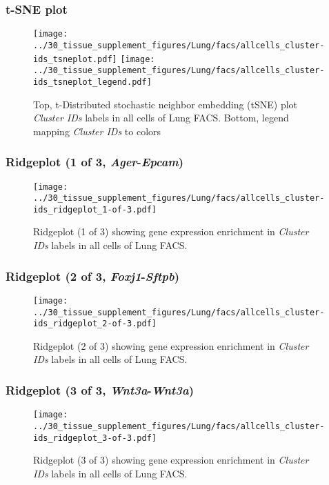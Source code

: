 \clearpage
\subsubsection{t-SNE plot}
\begin{figure}[h]
\centering
\texttt{[image: ../30\_tissue\_supplement\_figures/Lung/facs/allcells\_cluster-ids\_tsneplot.pdf]}
\texttt{[image: ../30\_tissue\_supplement\_figures/Lung/facs/allcells\_cluster-ids\_tsneplot\_legend.pdf]}
\caption{Top, t-Distributed stochastic neighbor embedding (tSNE) plot  \emph{Cluster IDs} labels in all cells of Lung FACS. Bottom, legend mapping \emph{Cluster IDs} to colors}
\end{figure}


\clearpage

\subsubsection{Ridgeplot (1 of 3, \emph{Ager}-\emph{Epcam})}
\begin{figure}[h]
\centering
\texttt{[image: ../30\_tissue\_supplement\_figures/Lung/facs/allcells\_cluster-ids\_ridgeplot\_1-of-3.pdf]}

\caption{ Ridgeplot (1 of 3)  showing gene expression enrichment in \emph{Cluster IDs} labels in all cells of Lung FACS. }
\end{figure}


\clearpage

\subsubsection{Ridgeplot (2 of 3, \emph{Foxj1}-\emph{Sftpb})}
\begin{figure}[h]
\centering
\texttt{[image: ../30\_tissue\_supplement\_figures/Lung/facs/allcells\_cluster-ids\_ridgeplot\_2-of-3.pdf]}

\caption{ Ridgeplot (2 of 3)  showing gene expression enrichment in \emph{Cluster IDs} labels in all cells of Lung FACS. }
\end{figure}


\clearpage

\subsubsection{Ridgeplot (3 of 3, \emph{Wnt3a}-\emph{Wnt3a})}
\begin{figure}[h]
\centering
\texttt{[image: ../30\_tissue\_supplement\_figures/Lung/facs/allcells\_cluster-ids\_ridgeplot\_3-of-3.pdf]}

\caption{ Ridgeplot (3 of 3)  showing gene expression enrichment in \emph{Cluster IDs} labels in all cells of Lung FACS. }
\end{figure}


